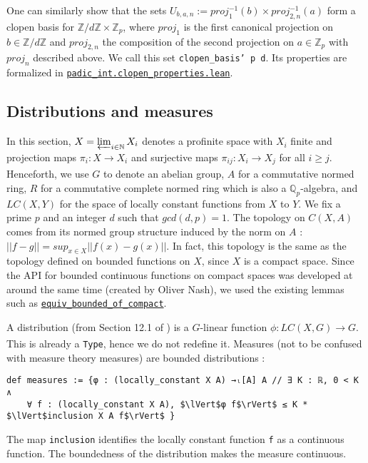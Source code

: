 \documentclass[a4paper,UKenglish,cleveref, autoref, thm-restate,pdfa]{lipics-v2021}
\newcommand{\lean}[1]{\texttt{#1}\xspace} %
\begin{document}
One can similarly show that the sets $U_{b, a, n} := proj_1^{-1} (b) \times proj_{2,n} ^{-1} (a)$ form a clopen basis for 
$\mathbb{Z} / d \mathbb{Z} \times \mathbb{Z}_p$, where $proj_1$ is the first canonical projection on $b \in \mathbb{Z} / d \mathbb{Z}$ 
and $proj_{2,n}$ the composition of the second projection on $a \in \mathbb{Z}_p$ with $proj_n$ described above. We call this set 
\lean{clopen\_basis' p d}. Its properties are formalized in \href{https://github.com/laughinggas/p-adic-L-functions/blob/main/src/padic_int/clopen_properties.lean}{\lean{padic\_int.clopen\_properties.lean}}.

\subsection{Distributions and measures}
In this section, $X = \varprojlim_{i \in \mathbb{N}} X_i$ denotes a profinite space with $X_i$ finite and
projection maps $\pi_i : X \xrightarrow[]{} X_i$ and surjective maps
$\pi_{ij} : X_i \xrightarrow[]{} X_j$ for all $i \ge j$. Henceforth, we use $G$ to denote an abelian group,
$A$ for a commutative normed ring, $R$ for a commutative complete normed ring which is also a $\mathbb{Q}_p$-algebra, 
and $LC(X,Y)$ for the space of locally constant functions from $X$ to $Y$. 
We fix a prime $p$ and an integer $d$ such that $gcd(d, p) =1$. \newline
The topology on $C(X, A)$ comes from its normed group structure induced by the norm on $A$ :
$|| f - g || = sup_{x \in X} || f(x) - g(x) ||$. In fact, this topology is the same as the 
topology defined on bounded functions on $X$, since $X$ is a compact space. Since the API for bounded 
continuous functions on compact spaces was developed at around the same time (created by Oliver Nash), 
we used the existing lemmas such as 
\href{https://github.com/leanprover-community/mathlib/blob/32253a1a1071173b33dc7d6a218cf722c6feb514/src/topology/continuous_function/compact.lean#L47}{\lean{equiv\_bounded\_of\_compact}}.

A distribution (from Section 12.1 of \cite{cyc}) is a $G$-linear function $\phi : LC(X, G) \xrightarrow[]{} G$. 
This is already a \lean{Type}, hence we do not redefine it. 
Measures (not to be confused with measure theory measures) are bounded distributions :
\begin{lstlisting}
def measures := {φ : (locally_constant X A) →ₗ[A] A // ∃ K : ℝ, 0 < K ∧ 
    ∀ f : (locally_constant X A), $\lVert$φ f$\rVert$ ≤ K * $\lVert$inclusion X A f$\rVert$ }
\end{lstlisting}
The map \lean{inclusion} identifies the locally constant function \lean{f} as a continuous function. 
The boundedness of the distribution makes the measure continuous.
\end{document}
